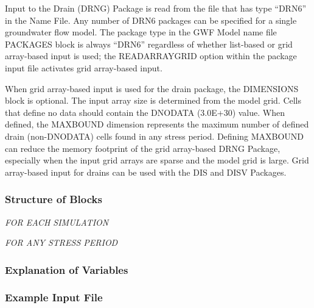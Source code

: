Input to the Drain (DRNG) Package is read from the file that has type ``DRN6'' in the Name File.  Any number of DRN6 packages can be specified for a single groundwater flow model.  The package type in the GWF Model name file PACKAGES block is always ``DRN6'' regardless of whether list-based or grid array-based input is used; the READARRAYGRID option within the package input file activates grid array-based input.

When grid array-based input is used for the drain package, the DIMENSIONS block is optional.  The input array size is determined from the model grid.  Cells that define no data should contain the DNODATA (3.0E+30) value.  When defined, the MAXBOUND dimension represents the maximum number of defined drain (non-DNODATA) cells found in any stress period.  Defining MAXBOUND can reduce the memory footprint of the grid array-based DRNG Package, especially when the input grid arrays are sparse and the model grid is large.  Grid array-based input for drains can be used with the DIS and DISV Packages.

\vspace{5mm}
\subsubsection{Structure of Blocks}
\vspace{5mm}

\noindent \textit{FOR EACH SIMULATION}


\vspace{5mm}
\noindent \textit{FOR ANY STRESS PERIOD}


\vspace{5mm}
\subsubsection{Explanation of Variables}
\begin{description}

\end{description}

\vspace{5mm}
\subsubsection{Example Input File}


